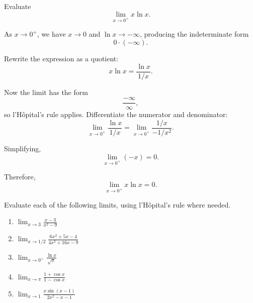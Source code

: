 \begin{Worked}
\begin{Problem}
Evaluate
\begin{equation*}
\lim_{x \to 0^+} x \ln x.
\end{equation*}
\end{Problem}
\begin{Solution}
As $x \to 0^+$, we have $x \to 0$ and $\ln x \to -\infty$, producing the
indeterminate form
\begin{equation*}
0 \cdot (-\infty).
\end{equation*}

Rewrite the expression as a quotient:
\begin{equation*}
x \ln x = \frac{\ln x}{1/x}.
\end{equation*}

Now the limit has the form
\begin{equation*}
\frac{-\infty}{\infty},
\end{equation*}
so l'H\^{o}pital's rule applies. Differentiate the numerator and denominator:
\begin{equation*}
\lim_{x \to 0^+} \frac{\ln x}{1/x}
= \lim_{x \to 0^+} \frac{1/x}{-1/x^2}.
\end{equation*}

Simplifying,
\begin{equation*}
\lim_{x \to 0^+} (-x) = 0.
\end{equation*}

Therefore,
\begin{equation*}
\lim_{x \to 0^+} x \ln x = 0.
\end{equation*}
\end{Solution}
\end{Worked}


\begin{Exercise}[label = LH2]
Evaluate each of the following limits, using l'H\^{o}pital's rule where needed.
\begin{enumerate}
\item $\lim_{x \to 3} \frac{x-3}{x^2-9}$
\item $\lim_{x \to 1/2} \frac{6x^2 + 5x - 4}{4x^2 + 16x - 9}$
\item $\lim_{x \to 0^+} \frac{\ln{x}}{\sqrt{x}}$
\item $\lim_{x \to \pi} \frac{1 + \cos{x}}{1 - \cos{x}}$
\item $\lim_{x \to 1} \frac{x\sin{(x - 1)}}{2x^2 - x - 1}$
\end{enumerate}
\end{Exercise}

